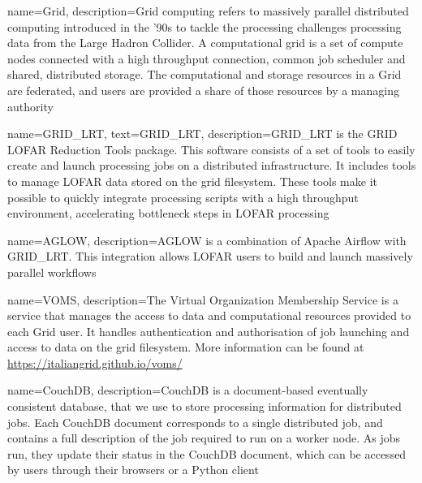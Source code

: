 {   
    name={Grid},
    description={Grid computing refers to massively parallel distributed computing introduced in the '90s to tackle the processing challenges processing data from the Large Hadron Collider. A computational grid is a set of compute nodes connected with a high throughput connection, common job scheduler and shared, distributed storage. The computational and storage resources in a Grid are federated, and users are provided a share of those resources by a managing authority }
}

{
    name={GRID\_LRT},
    text={GRID\_LRT},
    description={GRID\_LRT is the GRID LOFAR Reduction Tools package. This software consists of a set of tools to easily create and launch processing jobs on a distributed infrastructure. It includes tools to manage LOFAR data stored on the grid filesystem. These tools make it possible to quickly integrate processing scripts with a high throughput environment, accelerating bottleneck steps in LOFAR processing }
}


{
    name={AGLOW},
    description={AGLOW is a combination of Apache Airflow with GRID\_LRT. This integration allows LOFAR users to build and launch massively parallel workflows
}}


{
    name=VOMS,
    description={The Virtual Organization Membership Service is a service that manages the access to data and computational resources provided to each Grid user. It handles authentication and authorisation of job launching and access to data on the grid filesystem. More information can be found at \url{https://italiangrid.github.io/voms/} }
}

{
    name=CouchDB, 
    description={CouchDB is a document-based eventually consistent database, that we use to store processing information for distributed jobs. Each CouchDB document corresponds to a single distributed job, and contains a full description of the job required to run on a worker node. As jobs run, they update their status in the CouchDB document, which can be accessed by users through their browsers or a Python client}
}

